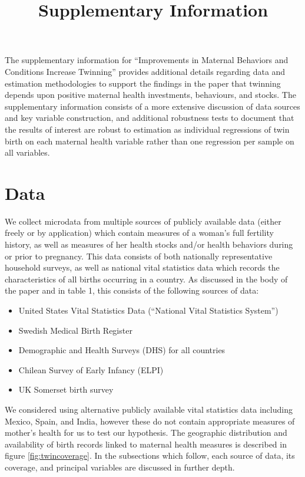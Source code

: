 \documentclass{nature}
\title{Supplementary Information}
\begin{document}
\maketitle

\begin{linenumbers}

The supplementary information for ``Improvements in Maternal Behaviors and Conditions Increase Twinning'' provides additional details regarding data and estimation methodologies to support the findings in the paper that twinning depends upon positive maternal health investments, behaviours, and stocks.  The supplementary information consists of a more extensive discussion of data sources and key variable construction, and additional robustness tests to document that the results of interest are robust to estimation as individual regressions of twin birth on each maternal health variable rather than one regression per sample on all variables.

\section{Data}
We collect microdata from multiple sources of publicly available data (either freely or by application) which contain measures of a woman's full fertility history, as well as measures of her health stocks and/or health behaviors during or prior to pregnancy.  This data consists of both nationally representative household surveys, as well as national vital statistics data which records the characteristics of all births occurring in a country.  As discussed in the body of the paper and in table 1, this consists of the following sources of data:
\begin{itemize}
\item United States Vital Statistics Data (``National Vital Statistics System'')
\item Swedish Medical Birth Register
\item Demographic and Health Surveys (DHS) for all countries
\item Chilean Survey of Early Infancy (ELPI)
\item UK Somerset birth survey
\end{itemize}
We considered using alternative publicly available vital statistics data including Mexico, Spain, and India, however these do not contain appropriate measures of mother's health for us to test our hypothesis.  The geographic distribution and availability of birth records linked to maternal health measures is described in figure \ref{fig:twincoverage}.  In the subsections which follow, each source of data, its coverage, and principal variables are discussed in further depth.


\end{linenumbers}
\end{document}
